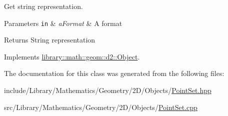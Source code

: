 Get string representation. 


\begin{DoxyParams}[1]{Parameters}
\mbox{\tt in}  & {\em a\+Format} & A format \\
\hline
\end{DoxyParams}
\begin{DoxyReturn}{Returns}
String representation 
\end{DoxyReturn}


Implements \hyperlink{classlibrary_1_1math_1_1geom_1_1d2_1_1_object_acdd76b3637732a249536b609dbe3f0eb}{library\+::math\+::geom\+::d2\+::\+Object}.



The documentation for this class was generated from the following files\+:\begin{DoxyCompactItemize}
\item 
include/\+Library/\+Mathematics/\+Geometry/2\+D/\+Objects/\hyperlink{2_d_2_objects_2_point_set_8hpp}{Point\+Set.\+hpp}\item 
src/\+Library/\+Mathematics/\+Geometry/2\+D/\+Objects/\hyperlink{2_d_2_objects_2_point_set_8cpp}{Point\+Set.\+cpp}\end{DoxyCompactItemize}

